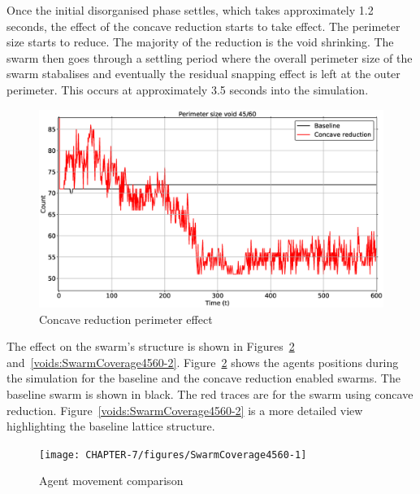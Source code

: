 Once the initial disorganised phase settles, which takes approximately 1.2 seconds, the effect of the concave reduction starts to take effect. The perimeter size starts to reduce. The majority of the reduction is the void shrinking. The swarm then goes through a settling period where the overall perimeter size of the swarm stabalises and eventually the residual snapping effect is left at the outer perimeter. This occurs at approximately 3.5 seconds into the simulation. 
\begin{figure}[H]
\begin{center}
\includegraphics[width=15cm]{CHAPTER-7/figures/ConcavePerimeter4560-1}
\end{center}
\caption{Concave reduction perimeter effect\label{methods:ConcavePerimeter4560-1}}
\end{figure}

The effect on the swarm's structure is shown in Figures~\ref{voids:SwarmCoverage4560-1} and~\ref{voids:SwarmCoverage4560-2}. Figure~\ref{voids:SwarmCoverage4560-1} shows the agents positions during the simulation for the baseline and the concave reduction enabled swarms. The baseline swarm is shown in black. The red traces are for the swarm using concave reduction. Figure~\ref{voids:SwarmCoverage4560-2} is a more detailed view highlighting the baseline lattice structure.
\begin{figure}[H]
\begin{center}
\texttt{[image: CHAPTER-7/figures/SwarmCoverage4560-1]}
\end{center}
\caption{Agent movement comparison\label{voids:SwarmCoverage4560-1}}
\end{figure}

